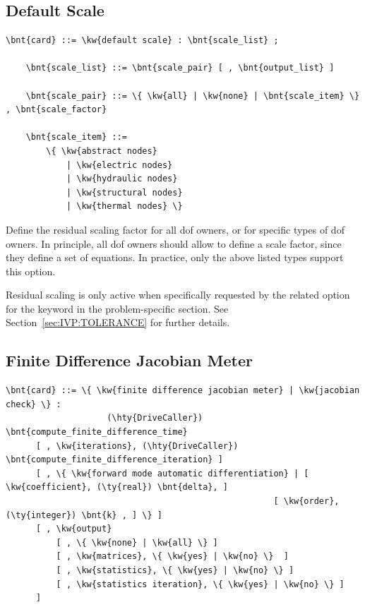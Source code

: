 \subsection{Default Scale}\label{sec:CONTROLDATA:DEFAULTSCALE}
\begin{Verbatim}[commandchars=\\\{\}]
    \bnt{card} ::= \kw{default scale} : \bnt{scale_list} ;

    \bnt{scale_list} ::= \bnt{scale_pair} [ , \bnt{output_list} ]

    \bnt{scale_pair} ::= \{ \kw{all} | \kw{none} | \bnt{scale_item} \} , \bnt{scale_factor}

    \bnt{scale_item} ::=
        \{ \kw{abstract nodes}
            | \kw{electric nodes}
            | \kw{hydraulic nodes}
            | \kw{structural nodes}
            | \kw{thermal nodes} \}
\end{Verbatim}
Define the residual scaling factor for all dof owners, or for specific
types of dof owners.
In principle, all dof owners should allow to define a scale factor,
since they define a set of equations.
In practice, only the above listed types support this option.

Residual scaling is only active when specifically requested
by the related option for the  keyword
in the problem-specific section.
See Section~\ref{sec:IVP:TOLERANCE} for further details.

\subsection{Finite Difference Jacobian Meter}\label{sec:CONTROLDATA:FDJAC_METER}
\begin{Verbatim}[commandchars=\\\{\}]
  \bnt{card} ::= \{ \kw{finite difference jacobian meter} | \kw{jacobian check} \} :
                    (\hty{DriveCaller}) \bnt{compute_finite_difference_time}
      [ , \kw{iterations}, (\hty{DriveCaller}) \bnt{compute_finite_difference_iteration} ]
      [ , \{ \kw{forward mode automatic differentiation} | [ \kw{coefficient}, (\ty{real}) \bnt{delta}, ]
                                                     [ \kw{order}, (\ty{integer}) \bnt{k} , ] \} ]
      [ , \kw{output}
          [ , \{ \kw{none} | \kw{all} \} ]
          [ , \kw{matrices}, \{ \kw{yes} | \kw{no} \}  ]
          [ , \kw{statistics}, \{ \kw{yes} | \kw{no} \} ]
          [ , \kw{statistics iteration}, \{ \kw{yes} | \kw{no} \} ]
      ]
\end{Verbatim}

